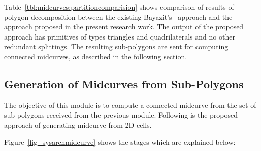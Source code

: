 Table~\ref{tbl:midcurves:partitioncomparision} shows comparison of results of polygon decomposition between the existing Bayazit's~\cite{Bayazit} approach and the approach proposed in the present research work. The output of the proposed approach has primitives of types triangles and quadrilaterals and no other redundant splittings. The resulting sub-polygons are sent for computing connected midcurves, as described in the following section.


\subsection{Generation of Midcurves from Sub-Polygons}

The objective of this module is to compute a connected midcurve from the set of sub-polygons received from the previous module.
Following is the proposed approach of generating midcurve from 2D cells.




Figure~\ref{fig_sysarchmidcurve} shows the stages which are explained below:

